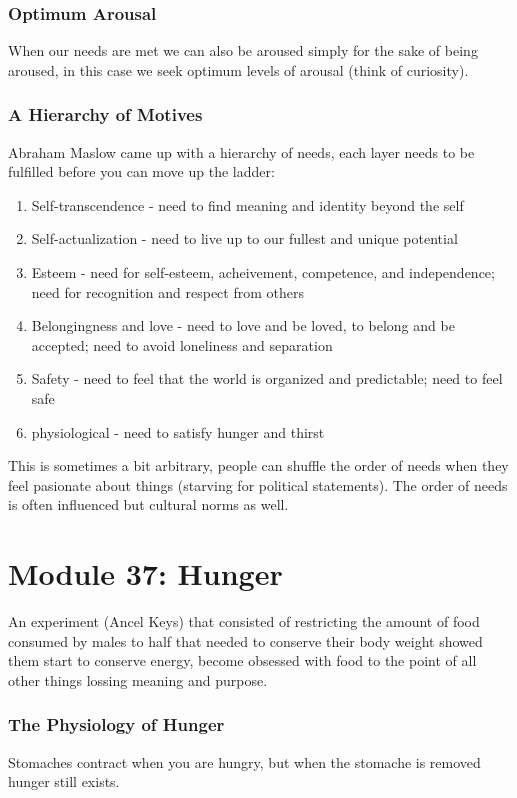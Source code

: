 \documentclass[12pt]{article}
\begin{document}
\section*{Optimum Arousal}
When our needs are met we can also be aroused simply for the sake of being aroused, in this case we seek optimum levels of arousal (think of curiosity).
\section*{A Hierarchy of Motives}
Abraham Maslow came up with a hierarchy of needs, each layer needs to be fulfilled before you can move up the ladder:
\begin{enumerate}
\item Self-transcendence - need to find meaning and identity beyond the self
\item Self-actualization - need to live up to our fullest and unique potential
\item  Esteem - need for self-esteem, acheivement, competence, and independence; need for recognition and respect from others
\item Belongingness  and love - need to love and be loved, to belong and be accepted; need to avoid loneliness and separation
\item Safety - need to feel that the world is organized and predictable; need to feel safe
\item physiological - need to satisfy hunger and thirst
\end{enumerate}
This is sometimes a bit arbitrary, people can shuffle the order of needs when they feel pasionate about things (starving for political statements). The order of needs is often influenced but cultural norms as well.

\part*{Module 37: Hunger}
An experiment (Ancel Keys) that consisted of restricting the amount of food consumed by males to half that needed to conserve their body weight showed them start to conserve energy, become obsessed with food to the point of all other things lossing meaning and purpose.
\section*{The Physiology of Hunger}
Stomaches contract when you are hungry, but when the stomache is removed hunger still exists.
\end{document}
